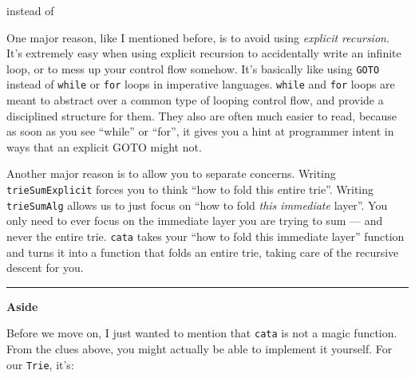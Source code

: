 \documentclass[]{article}
\newenvironment{Shaded}{}{}
\newcommand{\CommentTok}[1]{\textcolor[rgb]{0.38,0.63,0.69}{\textit{#1}}}
\newcommand{\DataTypeTok}[1]{\textcolor[rgb]{0.56,0.13,0.00}{#1}}
\newcommand{\DecValTok}[1]{\textcolor[rgb]{0.25,0.63,0.44}{#1}}
\newcommand{\FunctionTok}[1]{\textcolor[rgb]{0.02,0.16,0.49}{#1}}
\newcommand{\NormalTok}[1]{#1}
\newcommand{\OtherTok}[1]{\textcolor[rgb]{0.00,0.44,0.13}{#1}}
\begin{document}
instead of

\begin{Shaded}
\end{Shaded}

One major reason, like I mentioned before, is to avoid using \emph{explicit
recursion}. It's extremely easy when using explicit recursion to accidentally
write an infinite loop, or to mess up your control flow somehow. It's basically
like using \texttt{GOTO} instead of \texttt{while} or \texttt{for} loops in
imperative languages. \texttt{while} and \texttt{for} loops are meant to
abstract over a common type of looping control flow, and provide a disciplined
structure for them. They also are often much easier to read, because as soon as
you see ``while'' or ``for'', it gives you a hint at programmer intent in ways
that an explicit GOTO might not.

Another major reason is to allow you to separate concerns. Writing
\texttt{trieSumExplicit} forces you to think ``how to fold this entire trie''.
Writing \texttt{trieSumAlg} allows us to just focus on ``how to fold \emph{this
immediate} layer''. You only need to ever focus on the immediate layer you are
trying to sum --- and never the entire trie. \texttt{cata} takes your ``how to
fold this immediate layer'' function and turns it into a function that folds an
entire trie, taking care of the recursive descent for you.

\begin{center}\rule{0.5\linewidth}{\linethickness}\end{center}

\textbf{Aside}

Before we move on, I just wanted to mention that \texttt{cata} is not a magic
function. From the clues above, you might actually be able to implement it
yourself. For our \texttt{Trie}, it's:
\end{document}
